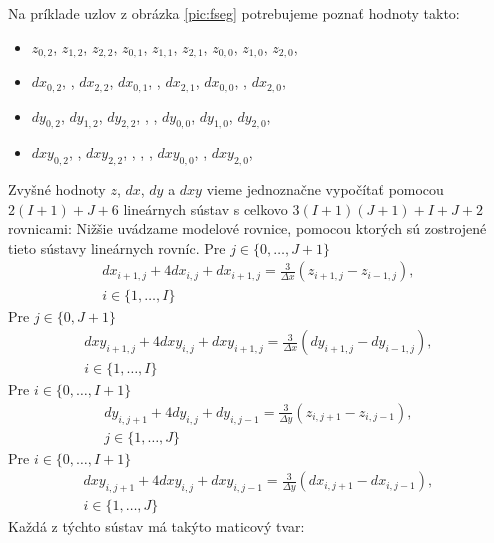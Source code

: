 \documentclass{rnthesis}
\begin{document}
Na príklade uzlov z obrázka \ref{pic:fseg} potrebujeme poznať hodnoty takto:
\begin{itemize}
	\item
	$z_{0,2}$, $z_{1,2}$, $z_{2,2}$,\newline
	$z_{0,1}$, $z_{1,1}$, $z_{2,1}$,\newline
	$z_{0,0}$, $z_{1,0}$, $z_{2,0}$,\newline  
	\item
	$dx_{0,2}$, , $dx_{2,2}$,\newline
	$dx_{0,1}$, , $dx_{2,1}$,\newline
	$dx_{0,0}$, , $dx_{2,0}$,\newline 
	\item
	$dy_{0,2}$, $dy_{1,2}$, $dy_{2,2}$,\newline
	, , \newline
	$dy_{0,0}$, $dy_{1,0}$, $dy_{2,0}$,\newline
	\item
	$dxy_{0,2}$, , $dxy_{2,2}$,\newline
	, , ,\newline
	$dxy_{0,0}$, , $dxy_{2,0}$,\newline  
\end{itemize}

Zvyšné hodnoty $z$, $dx$, $dy$ a $dxy$ vieme jednoznačne vypočítať pomocou $2(I+1) + J + 6$ lineárnych sústav s celkovo $3(I+1)(J+1) + I + J + 2$ rovnicami:
Nižšie uvádzame modelové rovnice, pomocou ktorých sú zostrojené tieto sústavy lineárnych rovníc.
\newline
Pre $j \in \{0, \dots, J+1\}$
\begin{multline} \label{eq:deboor1}
dx_{i+1,j} + 4dx_{i,j} + dx_{i+1,j}
= \frac{3}{\Delta x}(z_{i+1,j} - z_{i-1,j}) \text{, }\\ i \in \{1, \dots, I\}
\end{multline}
Pre $j \in \{0, J+1\}$
\begin{multline} \label{eq:deboor2}
dxy_{i+1,j} + 4dxy_{i,j} + dxy_{i+1,j}
= \frac{3}{\Delta x}(dy_{i+1,j} - dy_{i-1,j}) \text{, }\\ i \in \{1, \dots, I\}
\end{multline}
Pre $i \in \{0, \dots, I+1\}$
\begin{multline} \label{eq:deboor3}
dy_{i,j+1} + 4dy_{i,j} + dy_{i,j-1}
= \frac{3}{\Delta y}(z_{i,j+1} - z_{i,j-1}) \text{, }\\ j \in \{1, \dots, J\}
\end{multline}
Pre $i \in \{0, \dots, I+1\}$
\begin{multline} \label{eq:deboor4}
dxy_{i,j+1} + 4dxy_{i,j} + dxy_{i,j-1}
= \frac{3}{\Delta y}(dx_{i,j+1} - dx_{i,j-1}) \text{, }\\ i \in \{1, \dots, J\}
\end{multline}
\newline
Každá z týchto sústav má takýto maticový tvar:
\end{document}
